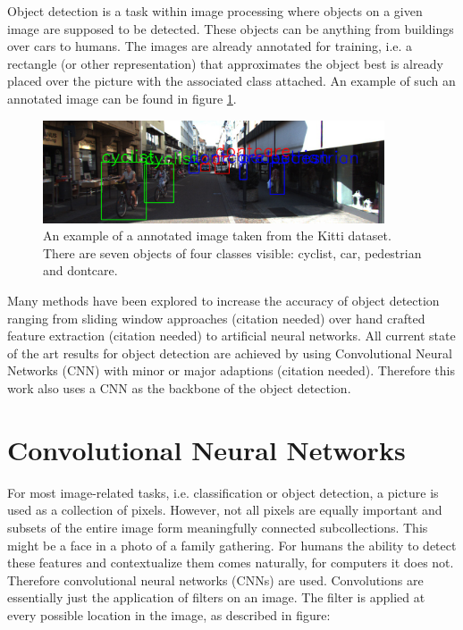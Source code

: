 Object detection is a task within image processing where objects on a given image are supposed to be detected. These objects can be anything from buildings over cars to humans. The images are already annotated for training, i.e. a rectangle (or other representation) that approximates the object best is already placed over the picture with the associated class attached. An example of such an annotated image can be found in figure \ref*{fig:annot_example}.

\begin{figure}[!htb]
	\centering
	\includegraphics[width=0.9\textwidth]{images/Annotations_example.png}
	\caption{An example of a annotated image taken from the Kitti dataset. There are seven objects of four classes visible: cyclist, car, pedestrian and dontcare.}
	\label{fig:annot_example}
\end{figure}

Many methods have been explored to increase the accuracy of object detection ranging from sliding window approaches (citation needed) over hand crafted feature extraction (citation needed) to artificial neural networks. All current state of the art results for object detection are achieved by using Convolutional Neural Networks (CNN) with minor or major adaptions (citation needed). Therefore this work also uses a CNN as the backbone of the object detection.
     
\section{Convolutional Neural Networks}

For most image-related tasks, i.e. classification or object detection, a picture is used as a collection of pixels. However, not all pixels are equally important and subsets of the entire image form meaningfully connected subcollections. This might be a face in a photo of a family gathering. For humans the ability to detect these features and contextualize them comes naturally, for computers it does not. Therefore convolutional neural networks (CNNs) \cite{LeCun1989BackpropagationAT} are used. Convolutions are essentially just the application of filters on an image. The filter is applied at every possible location in the image, as described in figure: 

